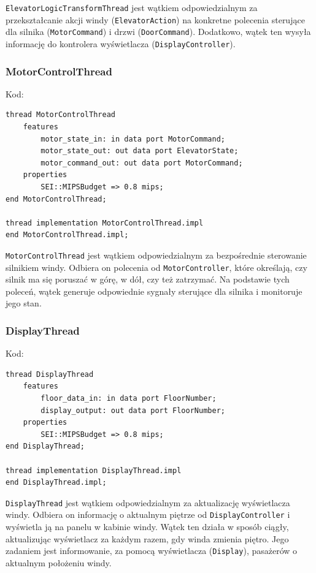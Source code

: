 \documentclass{article}
\begin{document}
    \texttt{ElevatorLogicTransformThread} jest wątkiem odpowiedzialnym za przekształcanie akcji windy (\texttt{ElevatorAction}) na konkretne polecenia sterujące dla silnika (\texttt{MotorCommand}) i drzwi (\texttt{DoorCommand}). Dodatkowo, wątek ten wysyła informację do kontrolera wyświetlacza (\texttt{DisplayController}).


    \newpage

    \subsubsection{MotorControlThread}

    Kod:
    
    \begin{lstlisting}[basicstyle=\ttfamily, keywordstyle=\bfseries]
thread MotorControlThread
    features
        motor_state_in: in data port MotorCommand;
        motor_state_out: out data port ElevatorState;
        motor_command_out: out data port MotorCommand;
    properties
        SEI::MIPSBudget => 0.8 mips;
end MotorControlThread;

thread implementation MotorControlThread.impl
end MotorControlThread.impl;
    \end{lstlisting}

    \texttt{MotorControlThread} jest wątkiem odpowiedzialnym za bezpośrednie sterowanie silnikiem windy. Odbiera on polecenia od \texttt{MotorController}, które określają, czy silnik ma się poruszać w górę, w dół, czy też zatrzymać. Na podstawie tych poleceń, wątek generuje odpowiednie sygnały sterujące dla silnika i monitoruje jego stan.


    \subsubsection{DisplayThread}

    Kod:
    
    \begin{lstlisting}[basicstyle=\ttfamily, keywordstyle=\bfseries]
thread DisplayThread
    features
        floor_data_in: in data port FloorNumber;
        display_output: out data port FloorNumber;
    properties
        SEI::MIPSBudget => 0.8 mips; 
end DisplayThread;

thread implementation DisplayThread.impl
end DisplayThread.impl;
    \end{lstlisting}

    \texttt{DisplayThread} jest wątkiem odpowiedzialnym za aktualizację wyświetlacza windy. Odbiera on informację o aktualnym piętrze od \texttt{DisplayController} i wyświetla ją na panelu w kabinie windy. Wątek ten działa w sposób ciągły, aktualizując wyświetlacz za każdym razem, gdy winda zmienia piętro. Jego zadaniem jest informowanie, za pomocą wyświetlacza (\texttt{Display}), pasażerów o aktualnym położeniu windy.
\end{document}
